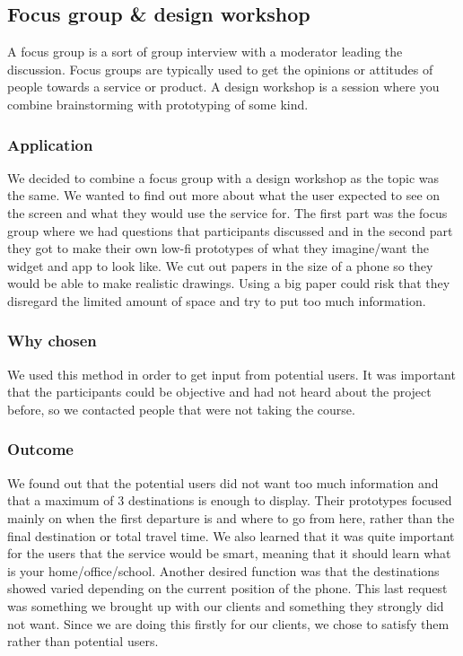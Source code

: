 \documentclass[a4paper]{article}
\begin{document}
		\subsection{Focus group \& design workshop}
		A focus group is a sort of group interview with a moderator leading the discussion. Focus groups are typically used to get the opinions or attitudes of people towards a service or product. A design workshop is a session where you combine brainstorming with prototyping of some kind.
		\subsubsection{Application}
		We decided to combine a focus group with a design workshop as the topic was the same. We wanted to find out more about what the user expected to see on the screen and what they would use the service for. The first part was the focus group where we had questions that participants discussed and in the second part they got to make their own low-fi prototypes of what they imagine/want the widget and app to look like. We cut out papers in the size of a phone so they would be able to make realistic drawings. Using a big paper could risk that they disregard the limited amount of space and try to put too much information.
	
		\subsubsection{Why chosen}
We used this method in order to get input from potential users. It was important that the participants could be objective and had not heard about the project before, so we contacted people that were not taking the course.
		\subsubsection{Outcome}
We found out that the potential users did not want too much information and that a maximum of 3 destinations is enough to display. Their prototypes focused mainly on when the first departure is and where to go from here, rather than the final destination or total travel time. We also learned that it was quite important for the users that the service would be smart, meaning that it should learn what is your home/office/school. Another desired function was that the destinations showed varied depending on the current position of the phone. This last request was something we brought up with our clients and something they strongly did not want. Since we are doing this firstly for our clients, we chose to satisfy them rather than potential users.
	
\end{document}
